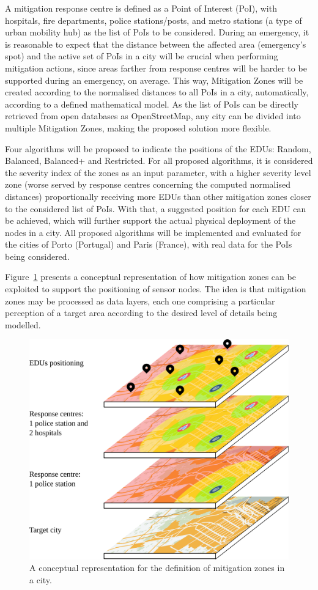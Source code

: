 \begin{refsection}
A mitigation response centre is defined as a Point of Interest (PoI), with hospitals, fire departments, police stations/posts, and metro stations (a type of urban mobility hub) as the list of PoIs to be considered. During an emergency, it is reasonable to expect that the distance between the affected area (emergency's spot) and the active set of PoIs in a city will be crucial when performing mitigation actions, since areas farther from response centres will be harder to be supported during an emergency, on average. This way, Mitigation Zones will be created according to the normalised distances to all PoIs in a city, automatically, according to a defined mathematical model. As the list of PoIs can be directly retrieved from open databases as OpenStreetMap, any city can be divided into multiple Mitigation Zones, making the proposed solution more flexible.

Four algorithms will be proposed to indicate the positions of the EDUs: Random, Balanced, Balanced+ and Restricted. For all proposed algorithms, it is considered the severity index of the zones as an input parameter, with a higher severity level zone (worse served by response centres concerning the computed normalised distances) proportionally receiving more EDUs than other mitigation zones closer to the considered list of PoIs. With that, a suggested position for each EDU can be achieved, which will further support the actual physical deployment of the nodes in a city. All proposed algorithms will be implemented and evaluated for the cities of Porto (Portugal) and Paris (France), with real data for the PoIs being considered. 

Figure~\ref{fig:smartcity} presents a conceptual representation of how mitigation zones can be exploited to support the positioning of sensor nodes. The idea is that mitigation zones may be processed as data layers, each one comprising a particular perception of a target area according to the desired level of details being modelled.

\begin{figure}[htbp!]
  \centering
  \includegraphics[width=0.7\linewidth]{Chapters/3-EDUs/images/map_layers.pdf}
  \caption{A conceptual representation for the definition of mitigation zones in a city.}\label{fig:smartcity}
\end{figure}


\end{refsection}
